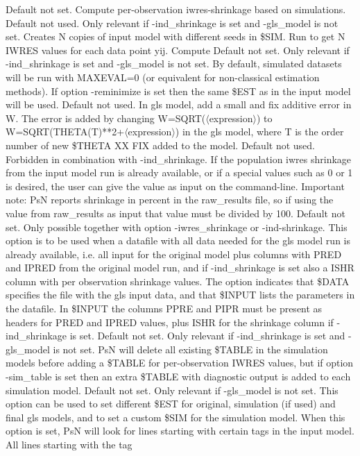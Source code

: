 \begin{optionlist}
Default not set. Compute per-observation iwres-shrinkage based on simulations. 
\nextopt
{}
Default not used. Only relevant if -ind\_shrinkage is set and -gls\_model is not set. Creates N copies of input model with different seeds in \$SIM. Run to get N IWRES values for each data point yij. Compute  
\nextopt
{}
Default not set. Only relevant if -ind\_shrinkage is set and -gls\_model is not set. By default, simulated datasets will be run with MAXEVAL=0 (or equivalent for non-classical estimation methods). If option -reminimize is set then the same \$EST as in the input model will be used. 
\nextopt
{}
Default not used. In gls model, add a small and fix additive error in W. The error is added by changing W=SQRT($\langle$expression$\rangle$) to W=SQRT(THETA(T)**2+$\langle$expression$\rangle$) in the gls model, where T is the order number of new \$THETA XX FIX added to the model. 
\nextopt
{}
Default not used. Forbidden in combination with -ind\_shrinkage. If the population iwres shrinkage from the input model run is already available, or if a special values such as 0 or 1 is desired, the user can give the value as input on the command-line. Important note: PsN reports shrinkage in percent in the raw\_results file, so if using the value from raw\_results as input that value must be divided by 100.   
\nextopt
{}
Default not set. Only possible together with option -iwres\_shrinkage or -ind-shrinkage. This option is to be used when a datafile with all data needed for the gls model run is already available, i.e. all input for the original model plus columns with PRED and IPRED from the original model run, and if -ind\_shrinkage is set also a ISHR column with per observation shrinkage values. The option indicates that \$DATA specifies the file with the gls input data, and that \$INPUT lists the parameters in the datafile. In \$INPUT the columns PPRE and PIPR must be present as headers for PRED and IPRED values, plus ISHR for the shrinkage column if -ind\_shrinkage is set. 
\nextopt
{}
Default not set. Only relevant if -ind\_shrinkage is set and -gls\_model is not set. PsN will delete all existing \$TABLE in the simulation models before adding a \$TABLE for per-observation IWRES values, but if option -sim\_table is set then an extra \$TABLE with diagnostic output is added to each simulation model. 
\nextopt
{}
Default not set. Only relevant if -gls\_model is not set. This option can be used to set different \$EST for original, simulation (if used) and final gls models, and to set a custom \$SIM for the simulation model. When this option is set, PsN will look for lines starting with certain tags in the input model. All lines starting with the tag



\end{optionlist}
